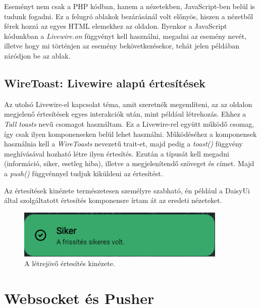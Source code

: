 \documentclass[
]{thesis-ekf}
\theoremstyle{definition}
\theoremstyle{remark}
\begin{document}
Eseményt nem csak a PHP kódban, hanem a nézetekben, JavaScript-ben belül is tudunk fogadni. Ez a felugró ablakok bezárásánál volt előnyös, hiszen a nézetből férek hozzá az egyes HTML elemekhez az oldalon. Ilyenkor a JavaScript kódunkban a \emph{Livewire.on} függvényt kell használni, megadni az esemény nevét, illetve hogy mi történjen az esemény bekövetkezésekor, tehát jelen példában záródjon be az ablak.



\subsection{WireToast: Livewire alapú értesítések}

Az utolsó Livewire-el kapcsolat téma, amit szeretnék megemlíteni, az az oldalon megjelenő értesítések egyes interakciók után, mint például létrehozás. Ehhez a \emph{Tall toasts}\cite{talltoasts} nevű csomagot használtam. Ez a Livewire-rel együtt működő csomag, így csak ilyen komponenseken belül lehet használni. Működéséhez a komponensek használnia kell a \emph{WireToasts} nevezetű trait-et, majd pedig a \emph{toast()} függvény meghívásával hozható létre ilyen értesítés. Ezután a típusát kell megadni (információ, siker, esetleg hiba), illetve a megjelenítendő szöveget és címet. Majd a \emph{push()} függvénnyel tudjuk kiküldeni az értesítést.



Az értesítések kinézete természetesen személyre szabható, én például a DaisyUi által szolgáltatott értesítés komponensre írtam át az eredeti nézeteket.

\begin{figure}[ht!]
	\centering
	\includegraphics[width=10cm]{../pictures/screenshots/notif.png}
	\caption{A létrejövő értesítés kinézete.}
	\label{toastUI}
\end{figure}

\section{Websocket és Pusher}
\end{document}
